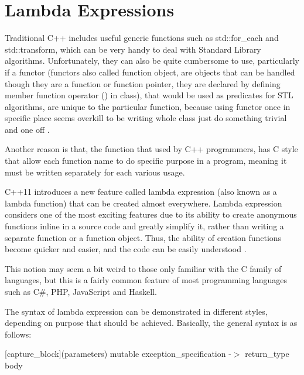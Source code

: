 \documentclass[11pt]{report}
\begin{document}
\section{Lambda Expressions}
\label{section: Lambda Expressions}
Traditional C++ includes useful generic functions such as std::for\_each and std::transform, which can be very handy to deal with Standard Library algorithms.  Unfortunately, they can also be quite cumbersome to use, particularly if a functor (functors also called function object, are objects that can be handled though they are a function or function pointer, they are declared by defining member function operator () in class), that would be used as predicates for STL algorithms, are unique to the particular function, because using functor once in specific place seems overkill to be writing whole class just do something trivial and one off \cite{Allain:2011:FutureCpp}. 
\newline

Another reason is that, the function that used by C++ programmers, has C style that  allow each function name to do specific purpose in a program, meaning it must be written separately for each various usage.
\newline

C++11 introduces a new feature called lambda expression (also known as a lambda function) that can be created almost everywhere. Lambda expression considers one of the most exciting features due to its ability to create anonymous functions inline in a source code and greatly simplify it, rather than writing a separate function or a function object.  Thus, the ability of creation functions become quicker and easier, and the code can be easily understood \cite{Gregorie:professionalcpp}.
\newline

This notion may seem a bit weird to those only familiar with the C family of languages, but this is a fairly common feature of most programming languages such as C\#, PHP, JavaScript and Haskell.  
\newline

The syntax of lambda expression can be demonstrated in different styles, depending on purpose that should be achieved. Basically, the general syntax is as follows:
\begin{center}
[capture\_block](parameters) mutable exception\_specification -$>$ return\_type {body}
\end{center}
\end{document}
